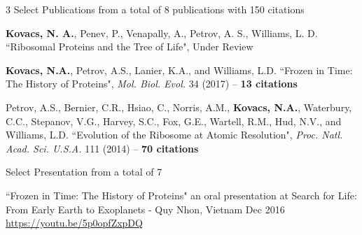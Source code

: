

\begin{cventries}

  \cventry
  	{3 Select Publications from a total of 8 publications with 150 citations} %
    {} %
    {} %
    {} %
    {\begin{cvitems}
    \item {\bf Kovacs, N. A.}, Penev, P., Venapally, A., Petrov, A. S., Williams, L. D. ``Ribosomal Proteins and the Tree of Life", Under Review
    \item {\bf Kovacs, N.A.}, Petrov, A.S., Lanier, K.A., and Williams, L.D. ``Frozen in Time: The History of Proteins", \textit{Mol. Biol. Evol.} 34 (2017) -- {\bf 13 citations}
    \item Petrov, A.S., Bernier, C.R., Hsiao, C., Norris, A.M., {\bf Kovacs, N.A.}, Waterbury, C.C., Stepanov, V.G., Harvey, S.C., Fox, G.E., Wartell, R.M., Hud, N.V., and Williams, L.D. ``Evolution of the Ribosome at Atomic Resolution", \textit{Proc. Natl. Acad. Sci. U.S.A.} 111 (2014) -- {\bf 70 citations}
    \end{cvitems}
    }
    
  \cventry
  	{Select Presentation from a total of 7} %
    {} %
    {} %
    {} %
    {\begin{cvitems}
    \item ``Frozen in Time: The History of Proteins" an oral presentation at Search for Life: From Early Earth to Exoplanets - Quy Nhon, Vietnam Dec 2016 \\ \href{https://youtu.be/5p0opfZxpDQ}{https://youtu.be/5p0opfZxpDQ}
    \end{cvitems}
    }
    
\vspace{-1em}

\end{cventries}
